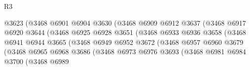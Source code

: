 \begin{lexlean}{R3}
\begin{coremodule}
                                      @3623
                                      (@3468
                                        @6901
                                        @6904
                                        @3630
                                        (@3468
                                          @6909
                                          @6912
                                          @3637
                                          (@3468
                                            @6917
                                            @6920
                                            @3644
                                            (@3468
                                              @6925
                                              @6928
                                              @3651
                                              (@3468
                                                @6933
                                                @6936
                                                @3658
                                                (@3468
                                                  @6941
                                                  @6944
                                                  @3665
                                                  (@3468
                                                    @6949
                                                    @6952
                                                    @3672
                                                    (@3468
                                                      @6957
                                                      @6960
                                                      @3679
                                                      (@3468
                                                        @6965
                                                        @6968
                                                        @3686
                                                        (@3468
                                                          @6973
                                                          @6976
                                                          @3693
                                                          (@3468
                                                            @6981
                                                            @6984
                                                            @3700
                                                            (@3468
                                                              @6989

\end{coremodule}
\end{lexlean}
